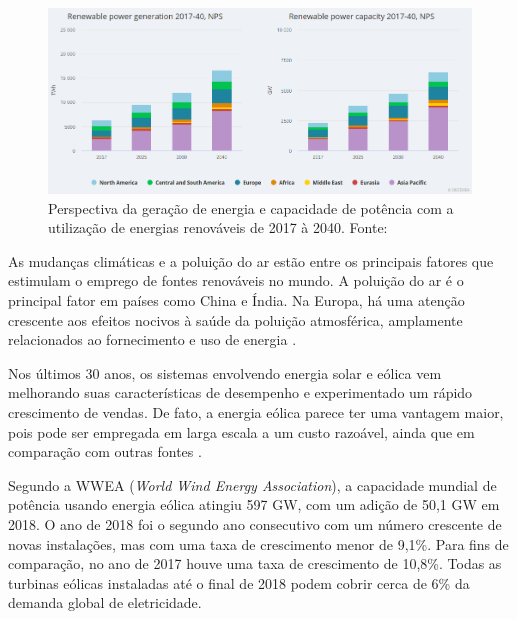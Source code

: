 \begin{figure}[!hbt]
	\begin{center}
    \includegraphics[width=\textwidth]{figuras/geracao_capacidade_potencia_energias_renovaveis.png}
    \caption{Perspectiva da geração de energia e capacidade de potência com a utilização de energias renováveis de 2017 à 2040. Fonte: \cite{WEO2018}}
    \label{fig:geracao-capacidade-energias-renovaveis}
    \end{center}
\end{figure}

As mudanças climáticas e a poluição do ar estão entre os principais fatores que estimulam o 
emprego de fontes renováveis no mundo. 
A poluição do ar é o principal fator em países como China e Índia. 
Na Europa, há uma atenção crescente aos efeitos nocivos à saúde da poluição atmosférica, amplamente relacionados ao fornecimento e uso de energia \cite{Gielen2019}.


Nos últimos 30 anos, os sistemas envolvendo energia solar e eólica vem melhorando suas 
características de desempenho e experimentado um rápido crescimento de vendas. 
De fato, a energia eólica parece ter uma vantagem maior, pois pode ser empregada em 
larga escala a um custo razoável, ainda que em comparação com outras fontes \cite{Kumar2016}.

Segundo a WWEA (\textit{World Wind Energy Association}), a capacidade mundial de potência 
usando energia eólica atingiu 597 GW, com um adição de 50,1 GW em 2018.
O ano de 2018 foi o segundo ano consecutivo com um número crescente de novas instalações, 
mas com uma taxa de crescimento menor de 9,1\%. Para fins de comparação, no ano de 2017 houve uma 
taxa de crescimento de 10,8\%.
Todas as turbinas eólicas instaladas até o final de 2018 podem cobrir cerca de 6\% da demanda global de eletricidade.

